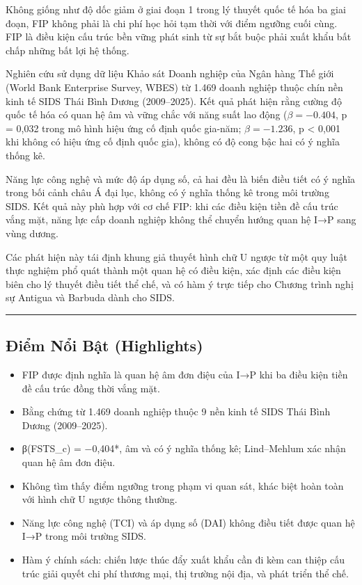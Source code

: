 \documentclass[12pt,a4paper]{article}
\providecommand{\tightlist}{\setlength{\itemsep}{0pt}\setlength{\parskip}{0pt}}
\begin{document}
Không giống như độ dốc giảm ở giai đoạn 1 trong lý thuyết quốc tế hóa ba
giai đoạn, FIP không phải là chi phí học hỏi tạm thời với điểm ngưỡng
cuối cùng. FIP là điều kiện cấu trúc bền vững phát sinh từ sự bắt buộc
phải xuất khẩu bất chấp những bất lợi hệ thống.

Nghiên cứu sử dụng dữ liệu Khảo sát Doanh nghiệp của Ngân hàng Thế giới
(World Bank Enterprise Survey, WBES) từ 1.469 doanh nghiệp thuộc chín
nền kinh tế SIDS Thái Bình Dương (2009--2025). Kết quả phát hiện rằng
cường độ quốc tế hóa có quan hệ âm và vững chắc với năng suất lao động
(\(\beta = −0.404\), p = 0,032 trong mô hình hiệu ứng cố định quốc
gia-năm; \(\beta = −1.236\), p \textless{} 0,001 khi không có hiệu ứng
cố định quốc gia), không có độ cong bậc hai có ý nghĩa thống kê.

Năng lực công nghệ và mức độ áp dụng số, cả hai đều là biến điều tiết có
ý nghĩa trong bối cảnh châu Á đại lục, không có ý nghĩa thống kê trong
môi trường SIDS. Kết quả này phù hợp với cơ chế FIP: khi các điều kiện
tiền đề cấu trúc vắng mặt, năng lực cấp doanh nghiệp không thể chuyển
hướng quan hệ I→P sang vùng dương.

Các phát hiện này tái định khung giả thuyết hình chữ U ngược từ một quy
luật thực nghiệm phổ quát thành một quan hệ có điều kiện, xác định các
điều kiện biên cho lý thuyết điều tiết thể chế, và có hàm ý trực tiếp
cho Chương trình nghị sự Antigua và Barbuda dành cho SIDS.

\begin{center}\rule{0.5\linewidth}{0.5pt}\end{center}

\hypertarget{ux111iux1ec3m-nux1ed5i-bux1eadt-highlights}{%
\subsection{Điểm Nổi Bật
(Highlights)}\label{ux111iux1ec3m-nux1ed5i-bux1eadt-highlights}}

\begin{itemize}
\tightlist
\item
  FIP được định nghĩa là quan hệ âm đơn điệu của I→P khi ba điều kiện
  tiền đề cấu trúc đồng thời vắng mặt.
\item
  Bằng chứng từ 1.469 doanh nghiệp thuộc 9 nền kinh tế SIDS Thái Bình
  Dương (2009--2025).
\item
  β(FSTS\_c) = −0,404*, âm và có ý nghĩa thống kê; Lind--Mehlum xác nhận
  quan hệ âm đơn điệu.
\item
  Không tìm thấy điểm ngưỡng trong phạm vi quan sát, khác biệt hoàn toàn
  với hình chữ U ngược thông thường.
\item
  Năng lực công nghệ (TCI) và áp dụng số (DAI) không điều tiết được quan
  hệ I→P trong môi trường SIDS.
\item
  Hàm ý chính sách: chiến lược thúc đẩy xuất khẩu cần đi kèm can thiệp
  cấu trúc giải quyết chi phí thương mại, thị trường nội địa, và phát
  triển thể chế.
\end{itemize}
\end{document}
